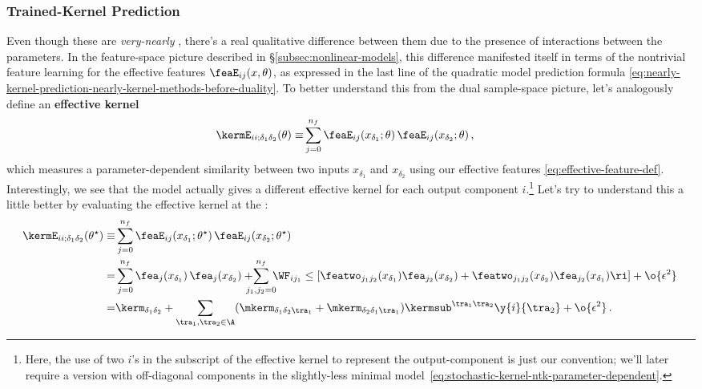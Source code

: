 \subsubsection{Trained-Kernel Prediction}
Even though these  are \emph{very-nearly} ,
there's a real qualitative difference between them due to the presence of interactions between the parameters.
In the feature-space picture described in \S\ref{subsec:nonlinear-models}, this difference manifested itself in terms of the nontrivial feature learning for the effective features $\feaE_{ij}(x,\theta)$, as expressed in the last line of the quadratic model prediction formula \eqref{eq:nearly-kernel-prediction-nearly-kernel-methods-before-duality}. To better understand this from the dual sample-space picture, let's analogously define an \textbf{effective kernel} 
\begin{align}\label{eq:effective-kernel-def}
\kermE_{ii;\delta_1 \delta_2 }(\theta) \equiv& \sum_{j=0}^{n_f} \feaE_{ij}(x_{\delta_1};\theta) \, \feaE_{ij}(x_{\delta_2};\theta) \, ,
\end{align}
which measures a parameter-dependent similarity between two inputs $x_{\delta_1}$ and $x_{\delta_2}$ using our effective features \eqref{eq:effective-feature-def}. Interestingly, we see that the model actually gives a different effective kernel for each output component $i$.\footnote{Here, the use of two $i$'s in the subscript of the effective kernel to represent the output-component is just our convention; we'll later require a version with off-diagonal components in the slightly-less minimal model~\eqref{eq:stochastic-kernel-ntk-parameter-dependent}.} 
Let's try to understand this a little better by evaluating the
effective kernel at the :
\begin{align}\label{eq:evolving-kernel-methods-kernel}
\kermE_{ii;\delta_1 \delta_2 }(\theta^{\star}) \equiv& \sum_{j=0}^{n_f} \feaE_{ij}(x_{\delta_1};\theta^{\star}) \, \feaE_{ij}(x_{\delta_2};\theta^{\star}) \, \\
=& \sum_{j=0}^{n_f} \fea_{j}(x_{\delta_1}) \, \fea_{j}(x_{\delta_2})+\!\!\!\!\!\sum_{j_1,j_2=0}^{n_f}\!\!\!\WF_{ij_1}\le[\featwo_{j_1j_2}(x_{\delta_1})\fea_{j_2}(x_{\delta_2})+ \featwo_{j_1j_2}(x_{\delta_2})\fea_{j_2}(x_{\delta_1})\ri]+ \o{\epsilon^2}\, \notag\\
=&\kerm_{\delta_1\delta_2}+\sum_{\tra_1,\tra_2\in\A}(\mkerm_{\delta_1\delta_2\tra_1}+\mkerm_{\delta_2\delta_1\tra_1})\kermsub^{\tra_1\tra_2}\y{i}{\tra_2}+\o{\epsilon^2}\, .
\notag
\end{align}
